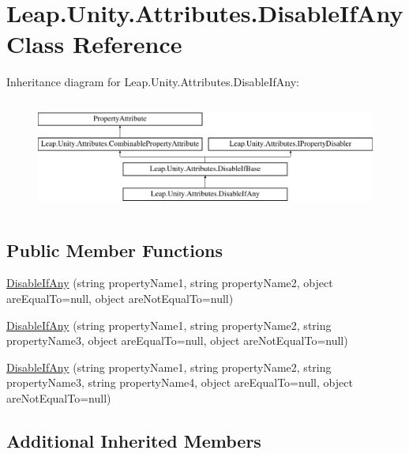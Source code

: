 \hypertarget{class_leap_1_1_unity_1_1_attributes_1_1_disable_if_any}{}\section{Leap.\+Unity.\+Attributes.\+Disable\+If\+Any Class Reference}
\label{class_leap_1_1_unity_1_1_attributes_1_1_disable_if_any}
Inheritance diagram for Leap.\+Unity.\+Attributes.\+Disable\+If\+Any\+:\begin{figure}[H]
\begin{center}
\leavevmode
\includegraphics[height=3.696370cm]{class_leap_1_1_unity_1_1_attributes_1_1_disable_if_any}
\end{center}
\end{figure}
\subsection*{Public Member Functions}
\begin{DoxyCompactItemize}
\item 
\mbox{\hyperlink{class_leap_1_1_unity_1_1_attributes_1_1_disable_if_any_a61e42a67b5fef33327da3713c21d0bd9}{Disable\+If\+Any}} (string property\+Name1, string property\+Name2, object are\+Equal\+To=null, object are\+Not\+Equal\+To=null)
\item 
\mbox{\hyperlink{class_leap_1_1_unity_1_1_attributes_1_1_disable_if_any_a88086e934faeb8ad9460a94fdfa58a0f}{Disable\+If\+Any}} (string property\+Name1, string property\+Name2, string property\+Name3, object are\+Equal\+To=null, object are\+Not\+Equal\+To=null)
\item 
\mbox{\hyperlink{class_leap_1_1_unity_1_1_attributes_1_1_disable_if_any_a7f5b83e25ef1268d183ffad009c62e9e}{Disable\+If\+Any}} (string property\+Name1, string property\+Name2, string property\+Name3, string property\+Name4, object are\+Equal\+To=null, object are\+Not\+Equal\+To=null)
\end{DoxyCompactItemize}
\subsection*{Additional Inherited Members}


